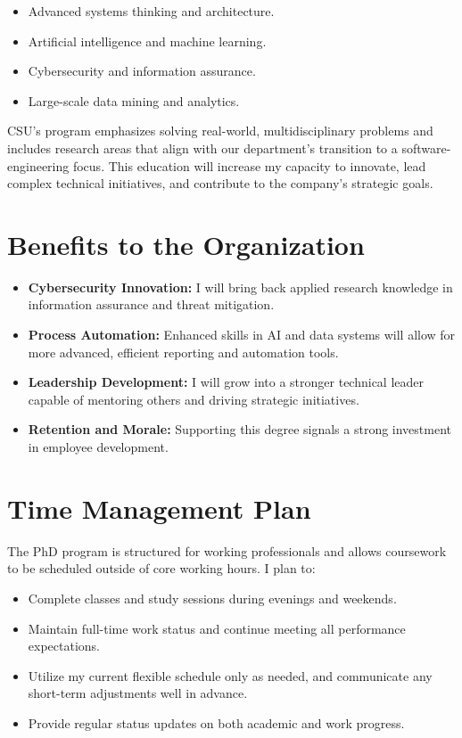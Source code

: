 \documentclass[11pt]{article}
\begin{document}
\begin{itemize}
    \item Advanced systems thinking and architecture.
    \item Artificial intelligence and machine learning.
    \item Cybersecurity and information assurance.
    \item Large-scale data mining and analytics.
\end{itemize}

CSU's program emphasizes solving real-world, multidisciplinary problems and includes research areas that align with our department's transition to a software-engineering focus. This education will increase my capacity to innovate, lead complex technical initiatives, and contribute to the company's strategic goals.

\section{Benefits to the Organization}

\begin{itemize}
    \item \textbf{Cybersecurity Innovation:} I will bring back applied research knowledge in information assurance and threat mitigation.
    \item \textbf{Process Automation:} Enhanced skills in AI and data systems will allow for more advanced, efficient reporting and automation tools.
    \item \textbf{Leadership Development:} I will grow into a stronger technical leader capable of mentoring others and driving strategic initiatives.
    \item \textbf{Retention and Morale:} Supporting this degree signals a strong investment in employee development.
\end{itemize}

\section{Time Management Plan}

The PhD program is structured for working professionals and allows coursework to be scheduled outside of core working hours. I plan to:

\begin{itemize}
    \item Complete classes and study sessions during evenings and weekends.
    \item Maintain full-time work status and continue meeting all performance expectations.
    \item Utilize my current flexible schedule only as needed, and communicate any short-term adjustments well in advance.
    \item Provide regular status updates on both academic and work progress.
\end{itemize}
\end{document}
